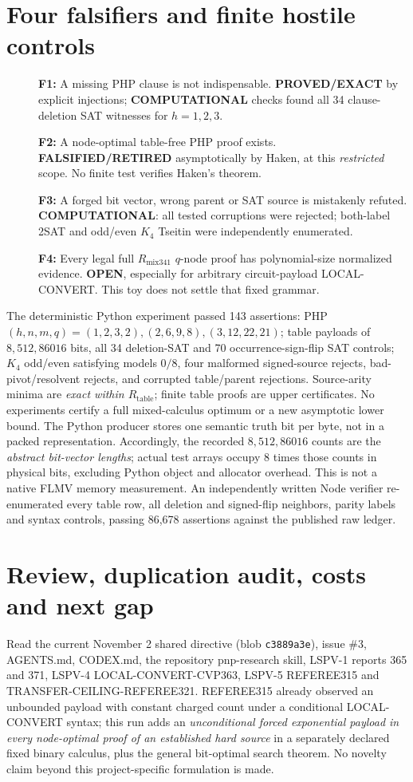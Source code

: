 \documentclass[11pt]{article}
\begin{document}
\section*{Four falsifiers and finite hostile controls}
\begin{description}
\item[] \textbf{F1:} A missing PHP clause is not indispensable.
\textbf{PROVED/EXACT} by explicit injections; \textbf{COMPUTATIONAL}
checks found all 34 clause-deletion SAT witnesses for $h=1,2,3$.
\item[] \textbf{F2:} A node-optimal table-free PHP proof exists.
\textbf{FALSIFIED/RETIRED} asymptotically by Haken, at this
\emph{restricted} scope. No finite test verifies Haken's theorem.
\item[] \textbf{F3:} A forged bit vector, wrong parent or SAT
source is mistakenly refuted. \textbf{COMPUTATIONAL}: all tested
corruptions were rejected; both-label 2SAT and odd/even
$K_4$ Tseitin were independently enumerated.
\item[] \textbf{F4:} Every legal full $R_{\mathrm{mix341}}$
$q$-node proof has polynomial-size normalized evidence.
\textbf{OPEN}, especially for arbitrary circuit-payload
LOCAL-CONVERT. This toy does not settle that fixed grammar.
\end{description}
The deterministic Python experiment passed 143 assertions:
PHP $(h,n,m,q)=(1,2,3,2),(2,6,9,8),(3,12,22,21)$;
table payloads of $8,512,86016$ bits, all 34 deletion-SAT
and 70 occurrence-sign-flip SAT controls; $K_4$ odd/even
satisfying models $0/8$, four malformed signed-source rejects,
bad-pivot/resolvent rejects, and corrupted table/parent
rejections. Source-arity minima are \emph{exact within
$R_{\mathrm{table}}$}; finite table proofs are upper certificates.
No experiments certify a full mixed-calculus optimum or a new
asymptotic lower bound.
The Python producer stores one semantic truth bit per byte, not in a
packed representation. Accordingly, the recorded $8,512,86016$ counts
are the \emph{abstract bit-vector lengths}; actual test arrays occupy
8 times those counts in physical bits, excluding Python object
and allocator overhead. This is not a native FLMV memory measurement.
An independently written Node verifier re-enumerated every table row,
all deletion and signed-flip neighbors, parity labels and syntax
controls, passing 86,678 assertions against the published raw ledger.


\section*{Review, duplication audit, costs and next gap}
Read the current November 2 shared directive (blob
\texttt{c3889a3e}), issue \#3, AGENTS.md, CODEX.md,
the repository pnp-research skill, LSPV-1 reports 365 and
371, LSPV-4 LOCAL-CONVERT-CVP363, LSPV-5
REFEREE315 and TRANSFER-CEILING-REFEREE321.
REFEREE315 already observed an unbounded payload with
constant charged count under a conditional LOCAL-CONVERT syntax;
this run adds an \emph{unconditional forced exponential
payload in every node-optimal proof of an established hard
source} in a separately declared fixed binary calculus, plus
the general bit-optimal search theorem. No novelty claim
beyond this project-specific formulation is made.
\end{document}

